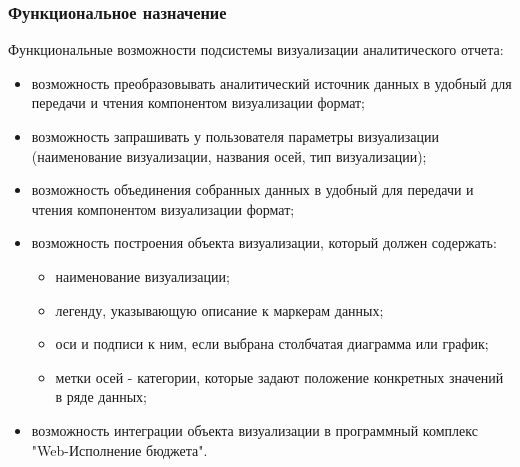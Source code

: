 \documentclass[a4paper]{extarticle}
\numberwithin{equation}{section}
\begin{document}
\subsubsection{Функциональное назначение}
Функциональные возможности подсистемы визуализации аналитического отчета:\par
\begin{itemize}
  \item возможность преобразовывать аналитический источник данных в удобный для передачи и чтения компонентом визуализации формат;
  \item возможность запрашивать у пользователя параметры визуализации (наименование визуализации, названия осей, тип визуализации);
  \item возможность объединения собранных данных в удобный для передачи и чтения компонентом визуализации формат;
  \item возможность построения объекта визуализации, который должен содержать:
    \begin{itemize}
    	\item наименование визуализации;
        \item легенду, указывающую описание к маркерам данных;
    	\item оси и подписи к ним, если выбрана столбчатая диаграмма или график;
        \item метки осей - категории, которые задают положение конкретных значений в ряде данных;
    \end{itemize}
  \item возможность интеграции объекта визуализации в программный комплекс "Web-Исполнение бюджета".
\end{itemize}\par
\end{document}
